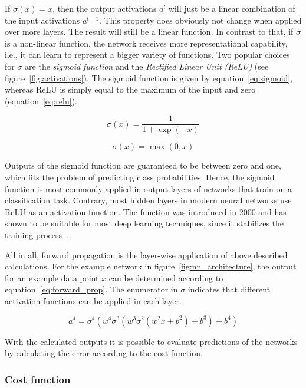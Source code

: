 If $\sigma(x) = x$, then the output activations $a^l$ will just be a linear
combination of the input activations $a^{l-1}$.
This property does obviously not change when applied over more layers.
The result will still be a linear function.
In contrast to that, if $\sigma$ is a non-linear function, the network receives more 
representational capability, i.e., it can learn to represent a bigger variety of 
functions. 
Two popular choices for $\sigma$ are the \textit{sigmoid function} and the
\textit{Rectified Linear Unit (ReLU)} (see figure~\ref{fig:activations}). 
The sigmoid function is given by equation~\ref{eq:sigmoid}, whereas ReLU is 
simply equal to the maximum of the input and zero (equation~\ref{eq:relu}).

\begin{equation}
  \label{eq:sigmoid}
  \sigma(x) = \frac{1}{1 + \exp(-x)}
\end{equation}

\begin{equation}
  \label{eq:relu}
  \sigma(x) = \max(0, x)
\end{equation}

Outputs of the sigmoid function are guaranteed to be between zero and one, which fits
the problem of predicting class probabilities.
Hence, the sigmoid function is most commonly applied in output layers of networks that
train on a classification task.
Contrary, most hidden layers in modern neural networks use ReLU as an activation
function.
The function was introduced in 2000 and has shown to be suitable for most deep
learning techniques, since it stabilizes the training process~\cite{Hahnioser2000, Nair2010}.

All in all, forward propagation is the layer-wise application of above described
calculations. For the example network in figure~\ref{fig:nn_architecture}, the
output for an example data point $x$ can be determined according to equation~\ref{eq:forward_prop}.
The enumerator in $\sigma$ indicates that different activation functions can
be applied in each layer.

\begin{equation}
  \label{eq:forward_prop}
  a^4 = \sigma^4(w^4 \sigma^3(w^3 \sigma^2(w^2 x + b^2) + b^3) + b^4)
\end{equation}

With the calculated outputs it is possible to evaluate predictions of the
networks by calculating the error according to the cost function.

\subsubsection{Cost function}

